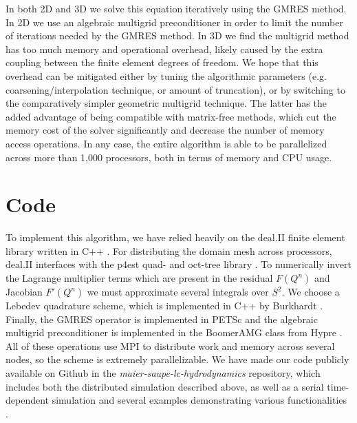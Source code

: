 \documentclass[reqno]{article}
\begin{document}
In both 2D and 3D we solve this equation iteratively using the GMRES method.
In 2D we use an algebraic multigrid preconditioner in order to limit the number
of iterations needed by the GMRES method.
In 3D we find the multigrid method has too much memory and operational overhead,
likely caused by the extra coupling between the finite element degrees of
freedom.
We hope that this overhead can be mitigated either by tuning the algorithmic
parameters (e.g. coarsening/interpolation technique, or amount of truncation),
or by switching to the comparatively simpler geometric multigrid technique.
The latter has the added advantage of being compatible with matrix-free methods,
which cut the memory cost of the solver significantly and decrease the number of
memory access operations.
In any case, the entire algorithm is able to be parallelized across more than
1,000 processors, both in terms of memory and CPU usage.

\section{Code}
To implement this algorithm, we have relied heavily on the deal.II finite
element library written in C++ \cite{arndt_dealii_2021}.
For distributing the domain mesh across processors, deal.II interfaces
with the p4est quad- and oct-tree library \cite{burstedde_p4est_2011}.
To numerically invert the Lagrange multiplier terms which are present in the
residual $F(Q^n)$ and Jacobian $F'(Q^n)$ we must approximate several integrals
over $S^2$.
We choose a Lebedev quadrature scheme, which is implemented in C++ by Burkhardt \cite{burkhardt_lebedev_quadrature}.
Finally, the GMRES operator is implemented in PETSc and the algebraic multigrid
preconditioner is implemented in the BoomerAMG class from Hypre
\cite{balay_petsc_2021, balay_petsctao_2021, balay_efficient_1997,
  falgout_design_2004, henson_boomeramg_2002}.
All of these operations use MPI to distribute work and memory across several
nodes, so the scheme is extremely parallelizable.
We have made our code publicly available on Github in the
\textit{maier-saupe-lc-hydrodynamics} repository, which includes both the
distributed simulation described above, as well as a serial time-dependent
simulation and several examples demonstrating various functionalities \cite{Myers_maier-saupe-lc-hydrodynamics_2022}.
\end{document}
